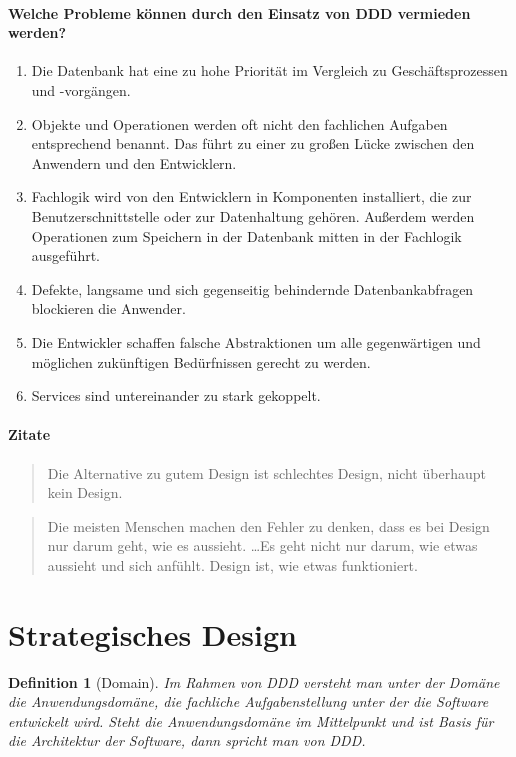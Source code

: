 \documentclass[11pt,a4paper]{scrartcl}
\newtheorem{Def}{Definition}[section]
\begin{document}
\paragraph{Welche Probleme können durch den Einsatz von DDD vermieden werden?}
\begin{enumerate}
	\item Die Datenbank hat eine zu hohe Priorität im Vergleich zu Geschäftsprozessen und -vorgängen.
	\item Objekte und Operationen werden oft nicht den fachlichen Aufgaben entsprechend benannt. Das führt zu einer zu großen Lücke zwischen den Anwendern und den Entwicklern.
	\item Fachlogik wird von den Entwicklern in Komponenten installiert, die zur Benutzerschnittstelle oder zur Datenhaltung gehören. Außerdem werden Operationen zum Speichern in der Datenbank mitten in der Fachlogik ausgeführt.
	\item Defekte, langsame und sich gegenseitig behindernde Datenbankabfragen blockieren die Anwender.
	\item Die Entwickler schaffen falsche Abstraktionen um alle gegenwärtigen und möglichen zukünftigen Bedürfnissen gerecht zu werden.
	\item Services sind untereinander zu stark gekoppelt.
\end{enumerate}

\paragraph{Zitate}

\begin{quote}
	Die Alternative zu gutem Design ist schlechtes Design, nicht überhaupt kein Design.~\cite[Douglas Martin]{martin}
\end{quote}

\begin{quote}
	Die meisten Menschen machen den Fehler zu denken, dass es bei Design nur darum geht, wie es aussieht. \dots Es geht nicht nur darum, wie etwas aussieht und sich anfühlt. Design ist, wie etwas funktioniert. \cite[Steve Jobs]{}
\end{quote}

\section{Strategisches Design}

\begin{Def}[Domain]
	Im Rahmen von DDD versteht man unter der Domäne die Anwendungsdomäne, die fachliche Aufgabenstellung unter der die Software entwickelt wird.
	Steht die Anwendungsdomäne im Mittelpunkt und ist Basis für die Architektur der Software, dann spricht man von DDD.
\end{Def}
\end{document}
